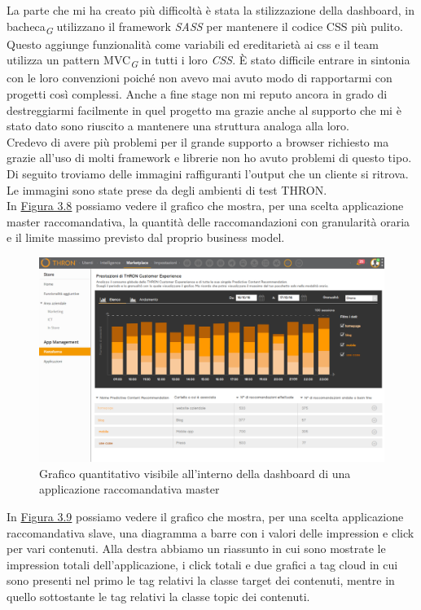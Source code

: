 \documentclass[a4paper, 12pt, twoside, openright]{book}
\newcommand{\gloss}[1]{#1\textsubscript{\textit{\tiny{G}}}}
\begin{document}
La parte che mi ha creato più difficoltà è stata la stilizzazione della dashboard, in \gloss{bacheca} utilizzano il framework \textit{SASS} per mantenere il codice CSS più pulito. Questo aggiunge funzionalità come variabili ed ereditarietà ai css e il team utilizza un pattern \gloss{MVC} in tutti i loro \textit{CSS}. \`{E} stato difficile entrare in sintonia con le loro convenzioni poiché non avevo mai avuto modo di rapportarmi con progetti così complessi. Anche a fine stage non mi reputo ancora in grado di destreggiarmi facilmente in quel progetto ma grazie anche al supporto che mi è stato dato sono riuscito a mantenere una struttura analoga alla loro.\\
Credevo di avere più problemi per il grande supporto a browser richiesto ma grazie all'uso di molti framework e librerie non ho avuto problemi di questo tipo.\\
Di seguito troviamo delle immagini raffiguranti l'output che un cliente si ritrova. Le immagini sono state prese da degli ambienti di test THRON.\\
In \hyperref[grafico-quantitativo]{Figura 3.8} possiamo vedere il grafico che mostra, per una scelta applicazione master raccomandativa, la quantità delle raccomandazioni con granularità oraria e il limite massimo previsto dal proprio business model. 
\begin{figure}[H]
	\centering
	\label{grafico-quantitativo}
	\includegraphics[width=1.0\textwidth]{images/grafico-quantitativo.jpg}
	\caption{Grafico quantitativo visibile all'interno della dashboard di una applicazione raccomandativa master}
\end{figure}
In \hyperref[grafico-qualitativo-1]{Figura 3.9} possiamo vedere il grafico che mostra, per una scelta applicazione raccomandativa slave, una diagramma a barre con i valori delle impression e click per vari contenuti. Alla destra abbiamo un riassunto in cui sono mostrate le impression totali dell'applicazione, i click totali e due grafici a tag cloud in cui sono presenti nel primo le tag relativi la classe target dei contenuti, mentre in quello sottostante le tag relativi la classe topic dei contenuti. 
\end{document}
